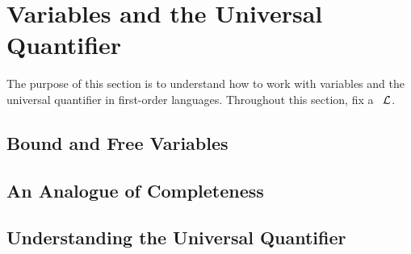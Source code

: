 \section{Variables and the Universal Quantifier}

The purpose of this section is to understand how to work with variables and the universal quantifier in first-order languages. Throughout this section, fix a \fola\ $\mathcal{L}$.

\subsection{Bound and Free Variables}



\subsection{An Analogue of Completeness}


\subsection{Understanding the Universal Quantifier}

